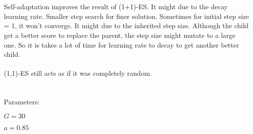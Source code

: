 \documentclass[A4]{article}
\begin{document}
\section{}
\label{sec:p6}

Self-adaptation improves the result of (1+1)-ES.
It might due to the decay learning rate. Smaller step search for finer solution.
Sometimes for initial step size = 1, it won't converge.
It might due to the inherited step size.
Although the child get a better score to replace the parent,
the step size might mutate to a large one.
So it is takes a lot of time for learning rate to decay to get another better child.
\\
\\
(1,1)-ES still acts as if it was completely random.

\section{}
\label{sec:p7}

Parameters:

$ G = 30 $

$ a = 0.85 $
\end{document}

